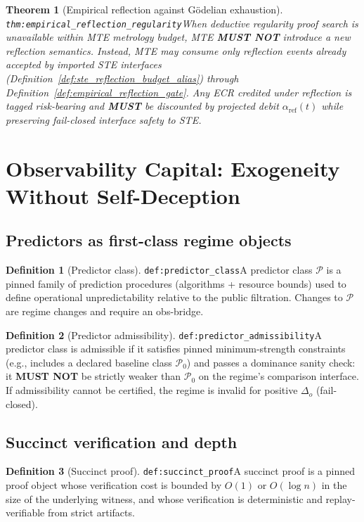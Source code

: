 \documentclass[11pt]{article}
\theoremstyle{definition}
\newtheorem{definition}{Definition}
\theoremstyle{plain}
\newtheorem{theorem}{Theorem}
\newcommand{\MUST}{\textbf{MUST}}
\newcommand{\MUSTNOT}{\textbf{MUST NOT}}
\newcommand{\STE}{\textsf{STE}}
\newcommand{\MTE}{\textsf{MTE}}
\newcommand{\lbl}[1]{\texttt{\footnotesize\nolinkurl{#1}}}
\newcommand{\DefLabel}[1]{\hfill{\small\lbl{#1}}}
\newcommand{\deltao}{\Delta_o}
\begin{document}
\begin{theorem}[Empirical reflection against G\"odelian exhaustion]\DefLabel{thm:empirical_reflection_regularity}\label{thm:empirical_reflection_regularity}
When deductive regularity proof search is unavailable within \MTE{} metrology budget, \MTE{} \MUSTNOT{} introduce a new reflection semantics.
Instead, \MTE{} may consume only reflection events already accepted by imported \STE{} interfaces (Definition~\ref{def:ste_reflection_budget_alias}) through Definition~\ref{def:empirical_reflection_gate}.
Any ECR credited under reflection is tagged risk-bearing and \MUST{} be discounted by projected debit $\alpha_{\mathrm{ref}}(t)$ while preserving fail-closed interface safety to \STE{}.
\end{theorem}

\section{Observability Capital: Exogeneity Without Self-Deception}\label{sec:capital}
\subsection{Predictors as first-class regime objects}
\begin{definition}[Predictor class]\DefLabel{def:predictor_class}\label{def:predictor_class}
A predictor class $\mathcal{P}$ is a pinned family of prediction procedures (algorithms + resource bounds) used to define operational unpredictability relative to the public filtration.
Changes to $\mathcal{P}$ are regime changes and require an obs-bridge.
\end{definition}

\begin{definition}[Predictor admissibility]\DefLabel{def:predictor_admissibility}\label{def:predictor_admissibility}
A predictor class is admissible if it satisfies pinned minimum-strength constraints (e.g., includes a declared baseline class $\mathcal{P}_0$) and passes a dominance sanity check: it \MUSTNOT{} be strictly weaker than $\mathcal{P}_0$ on the regime's comparison interface.
If admissibility cannot be certified, the regime is invalid for positive $\deltao$ (fail-closed).
\end{definition}

\subsection{Succinct verification and depth}
\begin{definition}[Succinct proof]\DefLabel{def:succinct_proof}\label{def:succinct_proof}
A succinct proof is a pinned proof object whose verification cost is bounded by $O(1)$ or $O(\log n)$ in the size of the underlying witness, and whose verification is deterministic and replay-verifiable from strict artifacts.
\end{definition}
\end{document}
